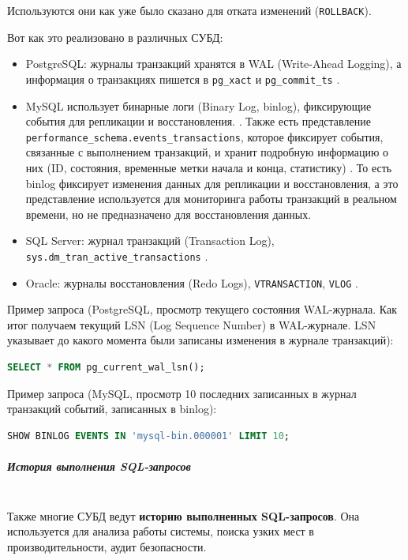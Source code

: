 Используются они как уже было сказано для отката изменений (\texttt{ROLLBACK}).

Вот как это реализовано в различных СУБД:

\begin{itemize}
    \item PostgreSQL: журналы транзакций хранятся в WAL (Write-Ahead Logging), а информация о транзакциях пишется в \texttt{pg\_xact} и \texttt{pg\_commit\_ts} \autocite{PostgreSQLdocc28}.
    \item MySQL использует бинарные логи (Binary Log, binlog), фиксирующие события для репликации и восстановления. \autocite{Mysqldoc3}. Также есть представление \texttt{performance\_schema.events\_transactions}, которое фиксирует события, связанные с выполнением транзакций, и хранит подробную информацию о них (ID, состояния, временные метки начала и конца, статистику) \autocite{Mysqldoc2}. То есть binlog фиксирует изменения данных для репликации и восстановления, а это представление используется для мониторинга работы транзакций в реальном времени, но не предназначено для восстановления данных. 
    \item SQL Server: журнал транзакций (Transaction Log), \texttt{sys.dm\_tran\_active\_transactions} \autocite{MicrosoftLearnSQLserverTransLog}.
    \item Oracle: журналы восстановления (Redo Logs), \texttt{V\textdollar TRANSACTION}, \texttt{V\textdollar LOG} \autocite{OracleRedoLog}.
\end{itemize}

Пример запроса (PostgreSQL, просмотр текущего состояния WAL-журнала. Как итог получаем текущий LSN (Log Sequence Number) в WAL-журнале. LSN указывает до какого момента были записаны изменения в журнале транзакций):
\begin{lstlisting}[language=SQL]
    SELECT * FROM pg_current_wal_lsn();                
\end{lstlisting}

Пример запроса (MySQL, просмотр 10 последних записанных в журнал транзакций событий, записанных в binlog):
\begin{lstlisting}[language=SQL]
    SHOW BINLOG EVENTS IN 'mysql-bin.000001' LIMIT 10;           
\end{lstlisting}

\subparagraph{История выполнения SQL-запросов} ~\\

Также многие СУБД ведут \textbf{историю выполненных SQL-запросов}. Она используется для анализа работы системы, поиска узких мест в производительности, аудит безопасности. 

